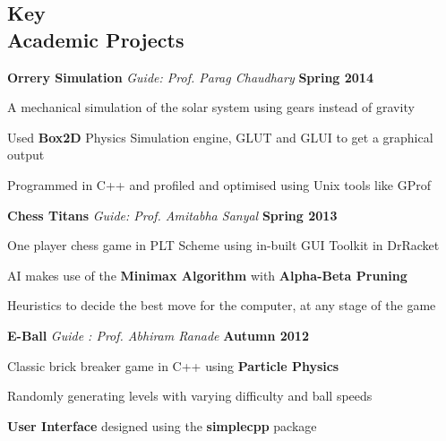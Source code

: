 \documentclass[margin,11pt]{resume}
\begin{document}
\begin{resume}
\section{\mysidestyle Key \\ Academic Projects}
\textbf{Orrery Simulation}  \hspace{2em} \textsl{Guide: Prof. Parag Chaudhary} \hspace{8em} \textbf{Spring 2014}
\vspace{-3.5mm}
\begin{list2}
\item A mechanical simulation of the solar system using gears instead of gravity 
\item Used \textbf{Box2D} Physics Simulation engine, GLUT and GLUI to get a graphical output
\item Programmed in C++ and profiled and optimised using Unix tools like GProf
\end{list2}
\vspace{-2mm}
\textbf{Chess Titans}  \hspace{5em} \textsl{Guide: Prof. Amitabha Sanyal} \hspace{8em} \textbf{Spring 2013}
\vspace{-3.5mm}
\begin{list2}
\item One player chess game in PLT Scheme using in-built GUI Toolkit in DrRacket 
\item AI makes use of the \textbf{Minimax Algorithm} with \textbf{Alpha-Beta Pruning}
\item Heuristics to decide the best move for the computer, at any stage of the game
\end{list2}
\vspace{-2mm}
\textbf{E-Ball}  \hspace{8em} \textsl{Guide : Prof. Abhiram Ranade} \hspace{7em} \textbf{Autumn 2012}
\vspace{-3.5mm}
\begin{list2}
\item Classic brick breaker game in C++ using \textbf{Particle Physics} 
\item Randomly generating levels with varying difficulty and ball speeds 
\item \textbf{User Interface} designed using the \textbf{simplecpp} package
\end{list2}


\end{resume}
\end{document}

